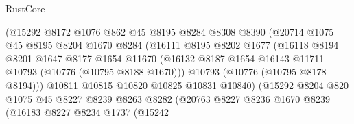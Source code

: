 \begin{lexlean}{RustCore}
\begin{coremodule}
                              (@15292
                                @8172
                                @1076
                                @862
                                @45
                                @8195
                                @8284
                                @8308
                                @8390
                                (@20714
                                  @1075
                                  @45
                                  @8195
                                  @8204
                                  @1670
                                  @8284
                                  (@16111
                                    @8195
                                    @8202
                                    @1677
                                    (@16118
                                      @8194
                                      @8201
                                      @1647
                                      @8177
                                      @1654
                                      @11670
                                      (@16132
                                        @8187
                                        @1654
                                        @16143
                                        @11711
                                        @10793
                                        (@10776 (@10795 @8188 @1670)))
                                      @10793
                                      (@10776 (@10795 @8178 @8194)))
                                    @10811
                                    @10815
                                    @10820
                                    @10825
                                    @10831
                                    @10840)
                                  (@15292
                                    @8204
                                    @820
                                    @1075
                                    @45
                                    @8227
                                    @8239
                                    @8263
                                    @8282
                                    (@20763
                                      @8227
                                      @8236
                                      @1670
                                      @8239
                                      (@16183
                                        @8227
                                        @8234
                                        @1737
                                        (@15242

\end{coremodule}
\end{lexlean}

